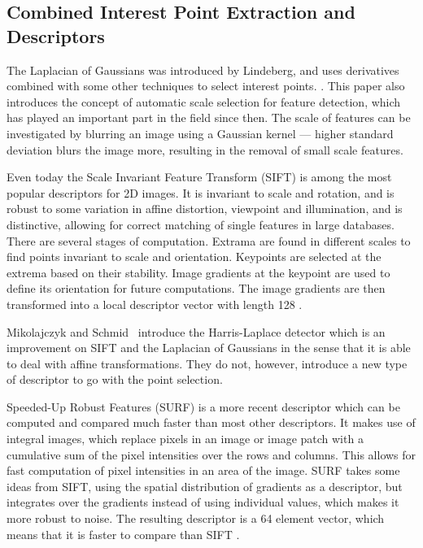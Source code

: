 \documentclass[10pt,a4paper]{article}
\begin{document}
\subsection{Combined Interest Point Extraction and Descriptors}
The Laplacian of Gaussians was introduced by Lindeberg, and uses derivatives
combined with some other techniques to select interest points.
\cite{lindeberg1998feature}. This paper also introduces the concept of automatic
scale selection for feature detection, which has played an important part in the
field since then. The scale of features can be investigated by blurring an image
using a Gaussian kernel --- higher standard deviation blurs the image more,
resulting in the removal of small scale features.

Even today the Scale Invariant Feature Transform (SIFT) is among the most
popular descriptors for 2D images. It is invariant to scale and rotation, and is
robust to some variation in affine distortion, viewpoint and illumination, and
is distinctive, allowing for correct matching of single features in large
databases. There are several stages of computation. Extrama are found in
different scales to find points invariant to scale and orientation. Keypoints
are selected at the extrema based on their stability. Image gradients at the
keypoint are used to define its orientation for future computations. The image
gradients are then transformed into a local descriptor vector with length 128
\cite{lowe2004distinctive}.

Mikolajczyk and Schmid~\cite{mikolajczyk2004scale} introduce the Harris-Laplace
detector which is an improvement on SIFT \cite{lowe2004distinctive} and the
Laplacian of Gaussians \cite{lindeberg1998feature} in the sense that it is able
to deal with affine transformations. They do not, however, introduce a new type
of descriptor to go with the point selection. 

Speeded-Up Robust Features (SURF) is a more recent descriptor which can be
computed and compared much faster than most other descriptors. It makes use of
integral images, which replace pixels in an image or image patch with a
cumulative sum of the pixel intensities over the rows and columns. This allows
for fast computation of pixel intensities in an area of the image. SURF takes
some ideas from SIFT, using the spatial distribution of gradients as a
descriptor, but integrates over the gradients instead of using individual
values, which makes it more robust to noise. The resulting descriptor is a 64
element vector, which means that it is faster to compare than SIFT
\cite{bay2008speeded}.
\end{document}
